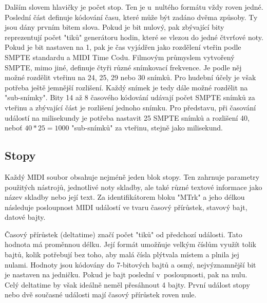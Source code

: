 Dalším slovem hlavičky je počet stop.
Ten je u~nultého formátu vždy roven jedné.
Poslední část definuje kódování času, 
které může být zadáno dvěma způsoby.
Ty jsou dány prvním bitem slova.
Pokud je bit nulový, 
pak zbývající bity reprezentují počet "tiků" generátoru hodin, 
které se vlezou do jedné čtvrťové noty.
Pokud je bit nastaven na 1, 
pak je čas vyjádřen jako rozdělení vteřin podle SMPTE standardu
a MIDI Time Codu.
\cite{Back_SMF_Specif}
Filmovým průmyslem vytvořený SMPTE, mimo jiné, 
definuje čtyři různé snímkovací frekvence.
Je podle něj možné rozdělit vteřinu na 24, 25, 29 nebo 30 snímků.
Pro hudební účely je však potřeba ještě jemnější rozlišení.
Každý snímek je tedy dále možné rozdělit na "sub-snímky".
\cite{Neznamy_aboutMIDIFiles}
Bity 14 až 8 časového kódování udávají počet SMPTE snímků za vteřinu 
a zbývající část je rozlišení jednoho snímku.
Pro představu,
při časování událostí na milisekundy je potřeba nastavit 25 SMPTE snímků
a rozlišení 40, neboť $ 40 * 25 = 1000 $ "sub-snímků" za vteřinu, 
stejně jako milisekund. 
\cite{Back_SMF_Specif}
\par

\subsection{Stopy}
Každý MIDI soubor obsahuje nejméně jeden blok stopy.
Ten zahrnuje parametry použitých nástrojů, jednotlivé noty skladby, 
ale také různé textové informace jako název skladby nebo její text.
Za identifikátorem bloku "MTrk" a jeho délkou 
následuje posloupnost MIDI událostí
ve tvaru časový přírůstek, stavový bajt, datové bajty.
\cite{Back_SMF_Specif}
\par

Časový přírůstek (deltatime) značí počet "tiků" od předchozí události.
Tato hodnota má proměnnou délku.
Její formát umožňuje velkým číslům využít tolik bajtů, 
kolik potřebují bez toho,
aby malá čísla plýtvala místem a plnila jej nulami.
Hodnoty jsou kódovány do 7-bitových bajtů 
a osmý, nejvýznamnější bit je nastaven na jedničku.
Pokud je bajt poslední v~posloupnosti, pak na nulu.
Celý deltatime by však ideálně neměl přesáhnout 4 bajty.
\cite{Neznamy_aboutMIDIFiles}
První událost stopy nebo dvě současné události 
mají časový přírůstek roven nule.
\cite{Back_SMF_Specif}
\par


